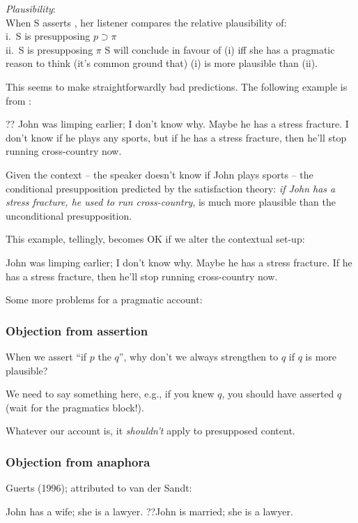 \documentclass[nols,twoside,nofonts,nobib,nohyper]{tufte-handout}
\begin{document}
\pex
\textit{Plausibility}:\\
\a When S asserts , her listener compares the relative plausibility of:\\
i. S is presupposing \(p ⊃ π\)\\
ii. S is presupposing \(π\)
\a S will conclude in favour of (i) iff she has a pragmatic reason to think (it's common ground that) (i) is more plausible than (ii).
\xe

This seems to make straightforwardly bad predictions. The following example is from \citet{mandelkern2016}:

\ex
?? John was limping earlier; I don't know why. Maybe he has a stress fracture. I don't know if he plays any sports, but if he has a stress fracture, then he'll stop running cross-country now.
\xe

Given the context -- the speaker doesn't know if John plays sports -- the conditional presupposition predicted by the satisfaction theory: \textit{if John has a stress fracture, he used to run cross-country}, is much more plausible than the unconditional presupposition.

This example, tellingly, becomes OK if we alter the contextual set-up:

\ex
John was limping earlier; I don't know why. Maybe he has a stress fracture. If he has a stress fracture, then he'll stop running cross-country now.
\xe

Some more problems for a pragmatic account:

\subsubsection{Objection from assertion}

When we assert \enquote{if \(p\) the \(q\)}, why don't we always strengthen to \(q\) if \(q\) is more plausible?

We need to say something here, e.g., if you knew \(q\), you should have asserted \(q\) (wait for the pragmatics block!).

Whatever our account is, it \textit{shouldn't} apply to presupposed content.

\subsubsection{Objection from anaphora}

Guerts (1996); attributed to van der Sandt:

\pex
\a\label{one}John has a wife; she is a lawyer.
\a\label{one2}??John is married; she is a lawyer.
\xe
\end{document}
